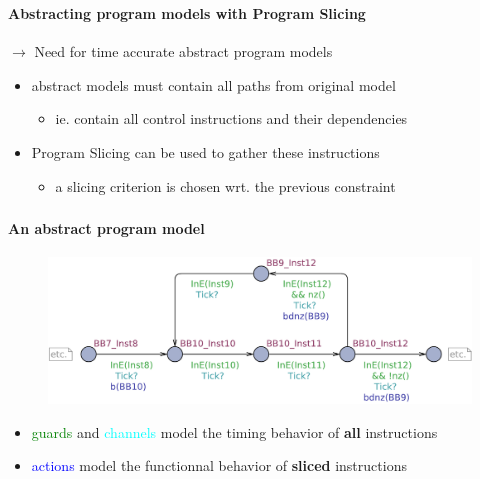 \documentclass[usenames,dvipsnames]{beamer}
\begin{document}
  \begin{frame}
    \frametitle{\subsecname}
    \framesubtitle{Abstracting program models with Program Slicing}

    \begin{center}
      $\rightarrow$ Need for time accurate abstract program models 
    \end{center}

    \begin{block}{}%
      \begin{itemize}
        \item abstract models must contain all paths from original model
          \begin{itemize}
            \item ie. contain all control instructions and their dependencies
          \end{itemize}
        
        \vspace{1em}
        \item Program Slicing can be used to gather these instructions
          \begin{itemize}
            \item a slicing criterion is chosen wrt. the previous constraint
          \end{itemize}
      \end{itemize}
    \end{block}
  \end{frame}

  \begin{frame}
    \frametitle{\subsecname}
    \framesubtitle{An abstract program model}
    \small

    \begin{figure}
      \centering
      \includegraphics[scale=.45]{fig/program}
    \end{figure}
    \begin{itemize}
      \item \textcolor{Green}{guards} and \textcolor{cyan}{channels} model the timing behavior of \textbf{all} instructions
      \vspace{-.4em}\item \textcolor{blue}{actions} model the functionnal behavior of \textbf{sliced} instructions
    \end{itemize}
  \end{frame}
\end{document}
